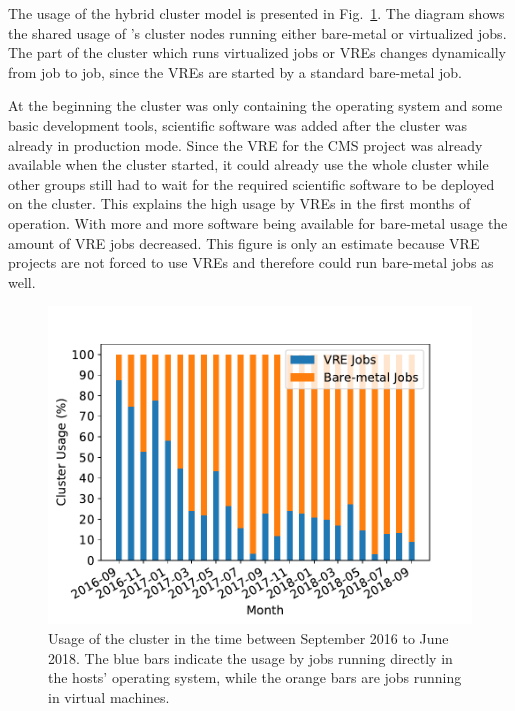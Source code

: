 The usage of the hybrid cluster model is presented in Fig.~\ref{fig-nodeusage}.
The diagram shows the shared usage of \NEMO's cluster nodes running either
bare-metal or virtualized jobs. The part of the cluster which runs virtualized
jobs or VREs changes dynamically from job to job, since the VREs are started by
a standard bare-metal job.

At the beginning the cluster was only containing the operating system and some
basic development tools, scientific software was added after the cluster was
already in production mode. Since the VRE for the CMS project was already
available when the \NEMO cluster started, it could already use the whole cluster
while other groups still had to wait for the required scientific software to be deployed on
the cluster. This explains the high usage by VREs in the first months of
operation. With more and more software being available for bare-metal usage the
amount of VRE jobs decreased. This figure is only an estimate because VRE
projects are not forced to use VREs and therefore could run bare-metal jobs as
well.



\begin{figure}
\begin{center}
  \includegraphics[width=\linewidth]{figures/NodeUsage_2016-09_2018-09.pdf}
  \caption{Usage of the \NEMO cluster in the time between September 2016
    to June 2018. The blue bars indicate the usage by jobs
    running directly in the hosts' operating system, while the orange bars are jobs
    running in virtual machines.}
  \label{fig-nodeusage}
\end{center}
\end{figure}

